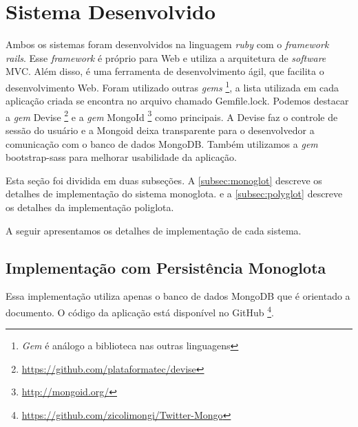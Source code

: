 \section{Sistema Desenvolvido}
\label{sec:applications}

Ambos os sistemas foram desenvolvidos na linguagem \textit{ruby} com o \textit{framework rails}. Esse \textit{framework} é próprio para Web e utiliza a arquitetura de \textit{software} \ac{MVC}. Além disso, é uma ferramenta de desenvolvimento ágil, que facilita o desenvolvimento Web.
Foram utilizado outras \textit{gems} \footnote{\textit{Gem} é análogo a biblioteca nas outras linguagens}, a lista utilizada em cada aplicação criada se encontra no arquivo chamado Gemfile.lock. Podemos destacar a \textit{gem} Devise \footnote{\url{https://github.com/plataformatec/devise}} e a \textit{gem} MongoId \footnote{\url{http://mongoid.org/}} como principais. A Devise faz o controle de sessão do usuário e a Mongoid deixa transparente para o desenvolvedor a comunicação com o banco de dados MongoDB. Também utilizamos a \textit{gem} bootstrap-sass para melhorar usabilidade da aplicação.

Esta seção foi dividida em duas subseções. A \autoref{subsec:monoglot} descreve os detalhes de implementação do sistema monoglota. e a \autoref{subsec:polyglot}  descreve os detalhes da implementação poliglota.

A seguir apresentamos os detalhes de implementação de cada sistema.

\subsection{Implementação com Persistência Monoglota}
\label{subsec:monoglot}

Essa implementação utiliza apenas o banco de dados MongoDB que é orientado a documento. O código da aplicação está disponível no GitHub \footnote{\url{https://github.com/zicolimongi/Twitter-Mongo}}.

